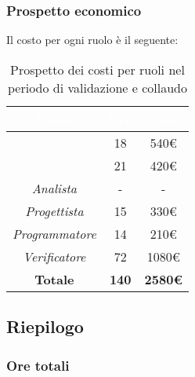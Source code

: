 \subsubsection{Prospetto economico}
Il costo per ogni ruolo è il seguente:
\begin{table}[H]
	\begin{center}
		\begin{tabular}{ c c c }
		\rowcolor{darkblue} 
		\textcolor{white}{\textbf{Ruolo}} & \textcolor{white}{\textbf{Ore}} & \textcolor{white}{\textbf{Costo}} \\ \hline
		\textit{\Responsabile} & 18 & 540€ \\ \hline
		\textit{\Amministratore} & 21 & 420€ \\ \hline
		\textit{Analista} & - & - \\ \hline
		\textit{Progettista} & 15 & 330€ \\ \hline
		\textit{Programmatore}  & 14 & 210€ \\ \hline
		\textit{Verificatore} & 72 & 1080€ \\ \hline
		\textbf{Totale} & \textbf{140} & \textbf{2580€} \\ \hline
		\end{tabular}
	\caption{ Prospetto dei costi per ruoli nel periodo di validazione e collaudo}
	\end{center}
\end{table}

\subsection{Riepilogo}
\subsubsection{Ore totali}
